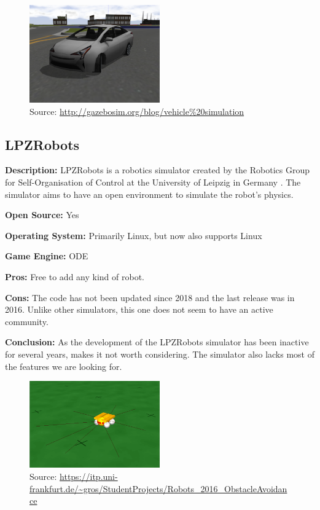 \begin{figure}[H]
    \centering
    \includegraphics[width=0.5\textwidth]{Simulators/gazebo.png}
    \caption{Source: \url{http://gazebosim.org/blog/vehicle\%20simulation}}
\end{figure}


\subsection{LPZRobots}
\textbf{Description:} LPZRobots is a robotics simulator created by the Robotics Group for Self-Organisation of Control at the University of Leipzig in Germany \cite{LPZRobots_Website, LPZRobots_book}. The simulator aims to have an open environment to simulate the robot's physics. 

\textbf{Open Source:} Yes

\textbf{Operating System:} Primarily Linux, but now also supports Linux

\textbf{Game Engine:} ODE

\textbf{Pros:} Free to add any kind of robot.

\textbf{Cons:} The code has not been updated since 2018 and the last release was in 2016. Unlike other simulators, this one does not seem to have an active community. 

\textbf{Conclusion:} As the development of the LPZRobots simulator has been inactive for several years, makes it not worth considering. The simulator also lacks most of the features we are looking for. 

\begin{figure}[H]
    \centering
    \includegraphics[width=0.5\textwidth]{Simulators/LPZRobots.png}
    \caption{Source: \url{https://itp.uni-frankfurt.de/~gros/StudentProjects/Robots\_2016\_ObstacleAvoidance}}
\end{figure}


